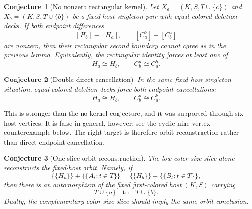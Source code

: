 \documentclass[11pt]{article}
\newtheorem{conjecture}{Conjecture}
\begin{document}
\begin{conjecture}[No nonzero rectangular kernel]
Let \(X_a=(K,S,T\cup\{a\})\) and \(X_b=(K,S,T\cup\{b\})\) be a fixed-host
singleton pair with equal colored deletion decks.  If both endpoint
differences
\[
  [H_b]-[H_a],
  \qquad
  [C_a^b]-[C_b^a]
\]
are nonzero, then their rectangular second boundary cannot agree as in the
previous lemma.  Equivalently, the rectangular identity forces at least one
of
\[
  H_a\cong H_b,
  \qquad
  C_b^a\cong C_a^b.
\]
\end{conjecture}

\begin{conjecture}[Double direct cancellation]
In the same fixed-host singleton situation, equal colored deletion decks force
both endpoint cancellations:
\[
  H_a\cong H_b,
  \qquad
  C_b^a\cong C_a^b.
\]
\end{conjecture}

This is stronger than the no-kernel conjecture, and it was supported through
six host vertices.  It is false in general, however; see the cyclic
nine-vertex counterexample below.  The right target is therefore orbit
reconstruction rather than direct endpoint cancellation.

\begin{conjecture}[One-slice orbit reconstruction]
The low color-size slice alone reconstructs the fixed-host orbit.  Namely, if
\[
  \{\!\{H_a\}\!\}+\{\!\{A_t:t\in T\}\!\}
  =
  \{\!\{H_b\}\!\}+\{\!\{B_t:t\in T\}\!\},
\]
then there is an automorphism of the fixed first-colored host \((K,S)\)
carrying
\[
  T\cup\{a\}
  \quad\text{to}\quad
  T\cup\{b\}.
\]
Dually, the complementary color-size slice should imply the same orbit
conclusion.
\end{conjecture}
\end{document}
